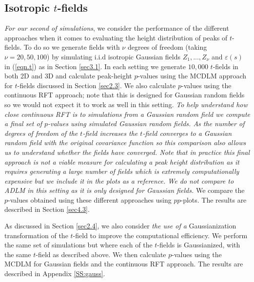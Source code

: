 \documentclass{article}
\newcommand{\nt}[1]{\textit{\color{red} #1}}
\begin{document}
\subsection{Isotropic $t$-fields}
\label{sec3.2}
\nt{For our second of simulations}, we consider the performance of the different approaches when it comes to evaluating the height distribution of peaks of $t$-fields. To do so we generate fields with $\nu$ degrees of freedom (taking $\nu = 20, 50, 100$) by simulating i.i.d isotropic Gaussian fields $Z_1,...,Z_\nu$ and $\varepsilon(s)$ in (\ref{eqn.t}) as in Section \ref{sec3.1}. In each setting we generate $10{,}000$ $t$-fields in both 2D and 3D and calculate peak-height $p$-values using the  MCDLM approach for $t$-fields discussed in Section \ref{sec2.3}. We also calculate $p$-values using the continuous RFT approach; note that this is designed for Gaussian random fields so we would not expect it to work as well in this setting. \nt{To help understand how close continuous RFT is to simulations from a Gaussian random field we compute a final set of $p$-values using simulated Gaussian random fields. As the number of degrees of freedom of the $t$-field increases the $t$-field converges to a Gaussian random field with the original covariance function so this comparison also allows us to understand whether the fields have converged. Note that in practice this final approach is not a viable measure for calculating a peak height distribution as it requires generating a large number of fields which is extremely computationally expensive but we include it in the plots as a reference. We do not compare to ADLM in this setting as it is only designed for Gaussian fields.} We compare the $p$-values obtained using these different approaches using $pp$-plots. The results are described in Section \ref{sec4.3}.

As discussed in Section \ref{sec2.4}, we also consider \nt{the use of a} Gaussianization transformation of the $t$-field to improve the computational efficiency. We perform the same set of simulations but where each of the $t$-fields is Gaussianized, with the same $t$-field as described above. We then calculate $p$-values using the MCDLM for Gaussian fields and the continuous RFT approach. The results are described in Appendix \ref{SS:gauss}.
\end{document}
